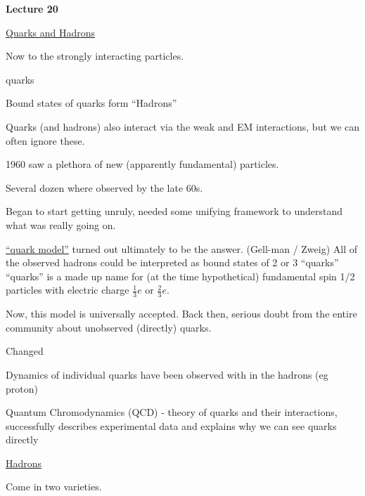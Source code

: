 



\thispagestyle{fancy}

\begin{center}
{\huge \textbf{Lecture 20}}
\end{center}

{\fontsize{14}{16}\selectfont

\underline{Quarks and Hadrons}

Now to the strongly interacting particles. 

\begin{center}
quarks 
\end{center}

Bound states of quarks form ``Hadrons''

Quarks (and hadrons) also interact via the weak and EM interactions, but we can often ignore these. 

1960 saw a plethora of new (apparently fundamental) particles. 

Several dozen where observed by the late 60s. 

Began to start getting unruly, needed some unifying framework to understand what was really going on. 

\underline{``quark model''} turned out ultimately to be the answer. (Gell-man / Zweig) 
All of the observed hadrons could be interpreted as bound states of 2 or 3 ``quarks''
``quarks'' is a made up name for (at the time hypothetical) fundamental spin 1/2 particles with electric charge $\frac{1}{3} e$ or $\frac{2}{3} e$.

Now, this model is universally accepted. 
Back then, serious doubt from the entire community about unobserved (directly) quarks. 
 
Changed
\bi
\item[-] Dynamics of individual quarks have been observed with in the hadrons (eg proton) 
\item[-] Quantum Chromodynamics (QCD) - theory of quarks and their interactions, successfully describes experimental data and explains why we can see quarks directly
\ei

\clearpage

\underline{Hadrons}

Come in two varieties.

}
